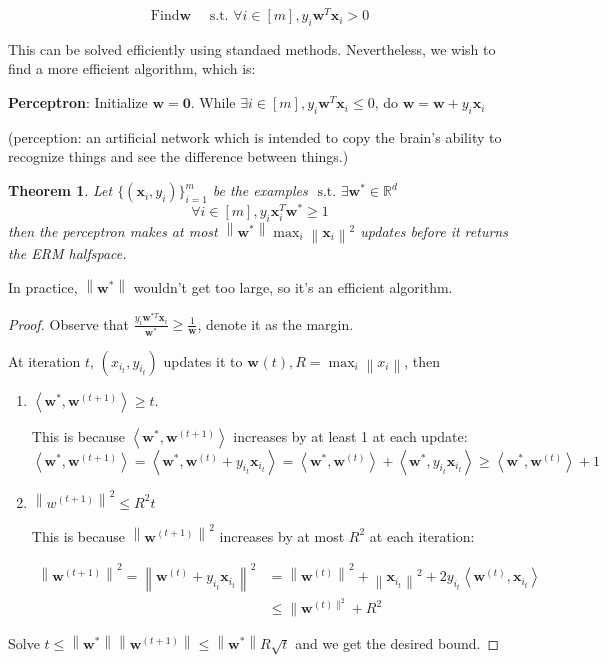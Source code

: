 \documentclass{book}
\newcommand{\R}{\mathbb{R}}
\newcommand{\st}{\text{ s.t. }}
\newcommand{\nm}[1]{\left\|#1\right\|}
\newcommand{\dual}[1]{\left<#1\right>}
\newtheorem{Thm}{Theorem}[section]
\begin{document}
\[\text{Find}\bm w\quad\st \forall i\in[m],y_{i}\bm{w}^{T}\bm{x}_{i}>0\]

This can be solved efficiently using standaed methods. Nevertheless, we wish to find a more efficient algorithm, which is:

\textbf{Perceptron}: Initialize $\bm w=\bm 0$. While $\exists i\in [m],y_{i}\bm w^{T}\bm x_{i}\leq 0$, do $\bm w=\bm w+y_{i}\bm x_{i}$ 

(perception: an artificial network which is intended to copy the brain's ability to recognize things and see the difference between things.)

\begin{Thm}
  Let $\{(\bm x_{i},y_{i})\}_{i=1}^{m}$ be the examples $\st\exists \bm w^{*}\in\R^{d}$
  \[\forall i\in [m],y_{i}\bm{x}_{i}^{T}\bm w^{*}\geq 1\]
  then the perceptron makes at most $\nm{\bm w^{*}}\max_{i}\nm{\bm x_{i}}^{2}$ updates before it returns the ERM halfspace.
\end{Thm}

In practice, $\nm{\bm{w}^{*}}$ wouldn't get too large, so it's an efficient algorithm.

\begin{proof}
Observe that $\frac{y_{i}\bm w^{*T}\bm x_{i}}{\bm w^{*}}\geq \frac{1}{\bm{w}}$, denote it as the margin. 

  At iteration $t$, $(x_{i_{t}},y_{i_{t}})$ updates it to $\bm w^{}{(t)},R=\max_{i}\nm{x_{i}}$, then
  \begin{enumerate}
  \item $\dual{\bm w^{*},\bm w^{(t+1)}}\geq t$.

    This is because $\dual{\bm{w}^{*},\bm w^{(t+1)}}$ increases by at least 1 at each update:
    \[\left\langle\boldsymbol{w}^{*}, \boldsymbol{w}^{(t+1)}\right\rangle=\left\langle\boldsymbol{w}^{*}, \boldsymbol{w}^{(t)}+y_{i_{t}} \boldsymbol{x}_{i_{t}}\right\rangle=\left\langle\boldsymbol{w}^{*}, \boldsymbol{w}^{(t)}\right\rangle+\left\langle\boldsymbol{w}^{*}, y_{i_{t}} \boldsymbol{x}_{i_{t}}\right\rangle \geq\left\langle\boldsymbol{w}^{*}, \boldsymbol{w}^{(t)}\right\rangle+1\]
\item $\nm{w^{(t+1)}}^{2}\leq R^{2}t$

  This is because $\nm{\bm w^{(t+1)}}^{2}$ increases by at most $R^{2}$ at each iteration:

  \[\begin{aligned}
\left\|\boldsymbol{w}^{(t+1)}\right\|^{2}=\left\|\boldsymbol{w}^{(t)}+y_{i_{t}} \boldsymbol{x}_{i_{t}}\right\|^{2} &=\left\|\boldsymbol{w}^{(t)}\right\|^{2}+\left\|\boldsymbol{x}_{i_{t}}\right\|^{2}+2 y_{i_{t}}\left\langle\boldsymbol{w}^{(t)}, \boldsymbol{x}_{i_{t}}\right\rangle \\
& \leq \| \boldsymbol{w}^{(t) \|^{2}}+R^{2}
\end{aligned}\]
  \end{enumerate}
  Solve $t\leq\nm{\bm w^{*}}\nm{\bm w^{(t+1)}}\leq\nm{\bm w^{*}}R\sqrt{t}$ and we get the desired bound.
\end{proof}
\end{document}
